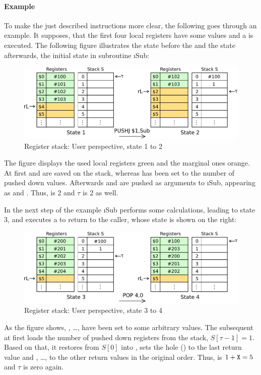 \paragraph{Example}

To make the just described instructions more clear, the following goes through an example. It supposes, that the first four local registers have some values and a  is executed. The following figure illustrates the state before the  and the state afterwards, \ie the initial state in subroutine \i{Sub}:
\begin{figure}[H]
	\centering
	\includegraphics[width=\textwidth]{img/push-pop-user1-crop.pdf}
	\caption{Register stack: User perspective, state 1 to 2}
	\label{figure:push-pop-user1}
\end{figure}
\noindent The figure displays the used local registers green and the marginal ones orange. At first  and  are saved on the stack, whereas  has been set to the number of pushed down values. Afterwards  and  are pushed as arguments to \i{Sub}, appearing as  and . Thus,  is 2 and $\tau$ is 2 as well.

In the next step of the example \i{Sub} performs some calculations, leading to state 3, and executes a  to return to the caller, whose state is shown on the right:
\begin{figure}[H]
	\centering
	\includegraphics[width=\textwidth]{img/push-pop-user2-crop.pdf}
	\caption{Register stack: User perspective, state 3 to 4}
	\label{figure:push-pop-user2}
\end{figure}
\noindent As the figure shows, , \dots,  have been set to some arbitrary values. The subsequent  at first loads the number of pushed down registers from the stack, \ie $S[\tau - 1] = 1$. Based on that, it restores  from $S[0]$ into , sets the hole () to the last return value  and , \dots,  to the other return values in the original order. Thus,  is $1+{\tt X} = 5$ and $\tau$ is zero again.

